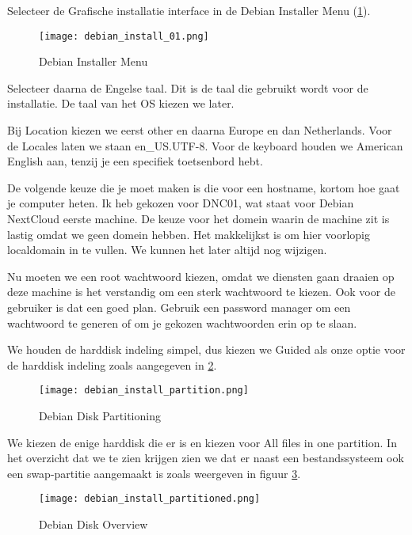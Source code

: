 Selecteer de Grafische installatie interface in de Debian Installer Menu (\ref{DebInstallMenu}).

\begin{figure}[H]
	\centering
	\texttt{[image: debian\_install\_01.png]}
	\caption{Debian Installer Menu}
	\label{DebInstallMenu}
\end{figure}

Selecteer daarna de Engelse taal. Dit is de taal die gebruikt wordt voor de installatie. De taal van het OS kiezen we later.

Bij Location kiezen we eerst other en daarna Europe en dan Netherlands. Voor de Locales laten we staan en\_US.UTF-8. Voor de keyboard houden we American English aan, tenzij je een specifiek toetsenbord hebt.

De volgende keuze die je moet maken is die voor een hostname, kortom hoe gaat je computer heten. Ik heb gekozen voor DNC01, wat staat voor Debian NextCloud eerste machine. De keuze voor het domein waarin de machine zit is lastig omdat we geen domein hebben. Het makkelijkst is om hier voorlopig localdomain in te vullen. We kunnen het later altijd nog wijzigen.

Nu moeten we een root wachtwoord kiezen, omdat we diensten gaan draaien op deze machine is het verstandig om een sterk wachtwoord te kiezen. Ook voor de gebruiker is dat een goed plan. Gebruik een password manager om een wachtwoord te generen of om je gekozen wachtwoorden erin op te slaan.

We houden de harddisk indeling simpel, dus kiezen we Guided als onze optie voor de harddisk indeling zoals aangegeven in \ref{DebDiskPart}.

\begin{figure}[H]
	\centering
	\texttt{[image: debian\_install\_partition.png]}
	\caption{Debian Disk Partitioning}
	\label{DebDiskPart}
\end{figure}

We kiezen de enige harddisk die er is en kiezen voor All files in one partition. In het overzicht dat we te zien krijgen zien we dat er naast een bestandssysteem ook een swap-partitie aangemaakt is zoals weergeven in figuur \ref{DebDiskParts}.

\begin{figure}[H]
	\centering
	\texttt{[image: debian\_install\_partitioned.png]}
	\caption{Debian Disk Overview}
	\label{DebDiskParts}
\end{figure}

